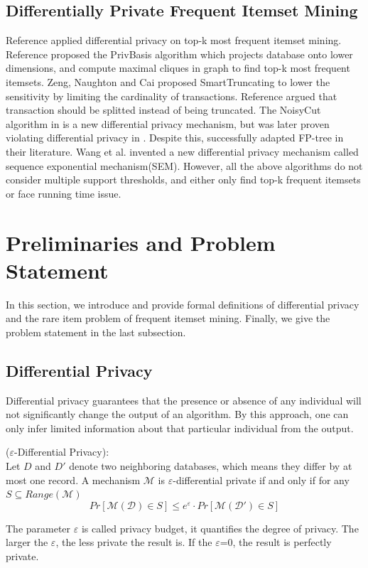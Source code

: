 \documentclass[conference]{IEEEtran}
\begin{document}
\subsection{Differentially Private Frequent Itemset Mining}
Reference \cite{b19} applied differential privacy on top-k most frequent itemset mining. 
Reference \cite{b7} proposed the PrivBasis algorithm which projects database onto lower dimensions, and compute maximal cliques in graph to find top-k most frequent itemsets. 
Zeng, Naughton and Cai\cite{b6} proposed SmartTruncating to lower the sensitivity by limiting the cardinality of transactions. 
Reference \cite{b20} argued that transaction should be splitted instead of being truncated. 
The NoisyCut algorithm in \cite{b8} is a new differential privacy mechanism, but was later proven violating differential privacy in \cite{b10} \cite{b11}. 
Despite this, \cite{b8} successfully adapted FP-tree in their literature. 
Wang et al.\cite{b21} invented a new differential privacy mechanism called sequence exponential mechanism(SEM). 
However, all the above algorithms do not consider multiple support thresholds, and either only find top-k frequent itemsets or face running time issue.

\section{Preliminaries and Problem Statement}\label{sec3}
In this section, we introduce and provide formal definitions of differential privacy and the rare item problem of frequent itemset mining. 
Finally, we give the problem statement in the last subsection.

\subsection{Differential Privacy}%
Differential privacy guarantees that the presence or absence of any individual will not significantly change the output of an algorithm.
By this approach, one can only infer limited information about that particular individual from the output.

\begin{definition}{($\varepsilon$-Differential Privacy):}\\
Let $D$ and $D'$ denote two neighboring databases, which means they differ by at most one record.
A mechanism $\mathcal{M}$ is $\varepsilon$-differential private if and only if for any $S \subseteq Range(\mathcal{M})$
\begin{equation}
Pr[\mathcal{M(D)}\in S] \leq e^\varepsilon \cdot Pr[\mathcal{M(D')}\in S]
\end{equation}
\end{definition}
The parameter $\varepsilon$ is called privacy budget, it quantifies the degree of privacy.
The larger the $\varepsilon$, the less private the result is. If the $\varepsilon$=0, the result is perfectly private. 
\end{document}
